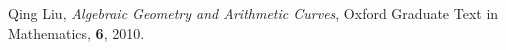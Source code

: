 \documentclass[12pt, a4paper, dvipdfmx]{jsarticle}
\theoremstyle{definition}
\numberwithin{equation}{section} %
\newcommand{\cat}[1]{\textup{\textsf{#1}}}%
\begin{document}
\begin{comment}
\begin{equation}
    \begin{tikzcd}
    \cat{C}
    \arrow[r, bend left, "F"] 
    \arrow[r, phantom, "\perp"] 
    & 
    \cat{C}' \arrow[l, bend left, "G"]
    \end{tikzcd}
\end{equation}
\end{comment}




\begin{thebibliography}{20}
\par
   Qing Liu, 
  \textit{Algebraic Geometry and Arithmetic Curves}, 
  Oxford Graduate Text in Mathematics, 
  \textbf{6}, 2010.
\end{thebibliography}
\end{document}

